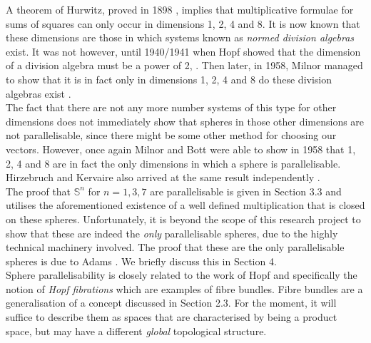 \documentclass[12pt,a4paper]{article}
\numberwithin{equation}{section}
\theoremstyle{definition}
\theoremstyle{remark}
\begin{document}
A theorem of Hurwitz, proved in 1898 \cite{Hurwitz1898,Hurwitz1923}, implies that multiplicative formulae for sums of squares can only occur in dimensions 1, 2, 4 and 8. It is now known that these dimensions are those in which systems known as \textit{normed division algebras} exist. It was not however, until 1940/1941 when Hopf showed that the dimension of a division algebra must be a power of 2, \cite{MR0004785}. Then later, in 1958, Milnor managed to show that it is in fact only in dimensions 1, 2, 4 and 8 do these division algebras exist \cite{MR0102805}.\\

The fact that there are not any more number systems of this type for other dimensions does not immediately show that spheres in those other dimensions are not parallelisable, since there might be some other method for choosing our vectors. However, once again Milnor and Bott \cite{MR0102804} were able to show in 1958 that 1, 2, 4 and 8 are in fact the only dimensions in which a sphere is parallelisable. Hirzebruch and Kervaire also arrived at the same result independently \cite{MR1415833,MR3075371,atiyah1961bott}.\\

The proof that $\mathbb{S}^n$ for $n=1,3,7$ are parallelisable is given in Section 3.3 and utilises the aforementioned existence of a well defined multiplication that is closed on these spheres. Unfortunately, it is beyond the scope of this research project to show that these are indeed the \textit{only} parallelisable spheres, due to the highly technical machinery involved. The proof that these are the only parallelisable spheres is due to Adams \cite{MR0141119}. We briefly discuss this in Section 4.\\

Sphere parallelisability is closely related to the work of Hopf and specifically the notion of \textit{Hopf fibrations} which are examples of fibre bundles. Fibre bundles are a generalisation of a concept discussed in Section 2.3. For the moment, it will suffice to describe them as spaces that are characterised by being  a product space, but may have a different \textit{global} topological structure. \\

\end{document}

